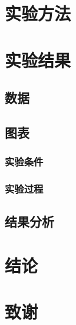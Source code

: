 \documentclass{ctexbook}
\begin{document}
    \section{实验方法}
    \section{实验结果}
    \subsection{数据}
    \subsection{图表}
    \subsubsection{实验条件}
    \subsubsection{实验过程}
    \subsection{结果分析}
    \section{结论}
    \section{致谢}
\end{document}
